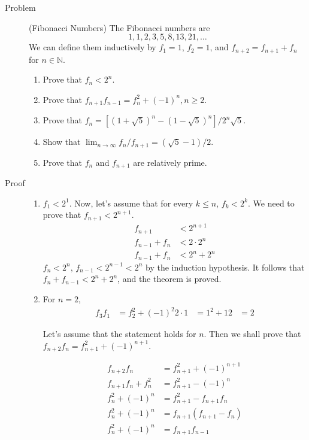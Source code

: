 \begin{description}
\item[Problem] (Fibonacci Numbers) The Fibonacci numbers are
$$1, 1, 2, 3, 5, 8, 13, 21, \dots$$
We can define them inductively by $f_1 = 1$, $f_2 = 1$, and $f_{n+2} = f_{n+1}
+ f_n$ for $n \in \mathbb{N}$.
\begin{enumerate}
\item Prove that $f_n < 2^n$.
\item Prove that $f_{n+1} f_{n-1} = f_n^2 + (-1)^n, n \ge 2$.
\item Prove that $f_n = \left[(1 + \sqrt 5)^n - (1 - \sqrt 5)^n\right]/2^n
\sqrt 5$.
\item Show that $\lim_{n\to\infty} f_n / f_{n+1} = (\sqrt 5 - 1) / 2$.
\item Prove that $f_n$ and $f_{n+1}$ are relatively prime.
\end{enumerate}

\item[Proof]
\begin{enumerate}
\item $f_1 < 2^1$. Now, let's assume that for every $k \le n$, $f_k < 2^k$.
We need to prove that $f_{n+1} < 2^{n+1}$.
\begin{align*}
f_{n+1} &< 2^{n+1} \\
f_{n-1} + f_n &< 2 \cdot 2^n \\
f_{n-1} + f_n &< 2^n + 2^n
\end{align*}
$f_n < 2^n$, $f_{n-1} < 2^{n-1} < 2^n$ by the induction hypothesis. It follows
that $f_n + f_{n-1} < 2^n + 2^n$, and the theorem is proved.

\item For $n = 2$,
\begin{align*}
f_3 f_1 &= f_2^2 + (-1)^2
2 \cdot 1 &= 1^2 + 1
2 &= 2
\end{align*}

Let's assume that the statement holds for $n$. Then we shall prove that
$f_{n+2} f_n = f_{n+1}^2 + (-1)^{n+1}$.

\begin{align*}
f_{n+2} f_n &= f_{n+1}^2 + (-1)^{n+1} \\
f_{n+1} f_n + f_n^2 &= f_{n+1}^2 - (-1)^n \\
f_n^2 + (-1)^n &= f_{n+1}^2 - f_{n+1} f_n \\
f_n^2 + (-1)^n &= f_{n+1} (f_{n+1} - f_n) \\
f_n^2 + (-1)^n &= f_{n+1} f_{n-1}
\end{align*}


\end{enumerate}
\end{description}

